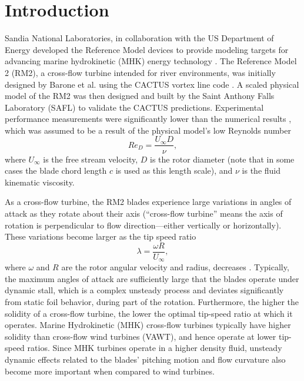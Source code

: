 \documentclass[10pt,letterpaper]{article}
\begin{document}
\linenumbers

\section*{Introduction}

Sandia National Laboratories, in collaboration with the US Department of Energy
developed the Reference Model devices to provide modeling targets for advancing
marine hydrokinetic (MHK) energy technology \cite{Neary2014}. The Reference
Model 2 (RM2), a cross-flow turbine intended for river environments, was
initially designed by Barone et al. \cite{Barone2011} using the CACTUS vortex
line code \cite{Murray2011}. A scaled physical model of the RM2 was then
designed and built by the Saint Anthony Falls Laboratory (SAFL) to validate the
CACTUS predictions. Experimental performance measurements were significantly
lower than the numerical results \cite{Hill2014}, which was assumed to be a
result of the physical model's low Reynolds number
\begin{equation}
    Re_D = \frac{U_\infty D}{\nu},
\label{eq:Re}
\end{equation}
where $U_\infty$ is the free stream velocity, $D$ is the rotor diameter (note
that in some cases the blade chord length $c$ is used as this length scale), and
$\nu$ is the fluid kinematic viscosity.

As a cross-flow turbine, the RM2 blades experience large variations in angles of
attack as they rotate about their axis (``cross-flow turbine'' means the axis of
rotation is perpendicular to flow direction---either vertically or
horizontally). These variations become larger as the tip speed ratio
\begin{equation}
    \lambda=\frac{\omega R}{U_\infty},
\end{equation}
where $\omega$ and $R$ are the rotor angular velocity and radius, decreases
\cite{Para2002}. Typically, the maximum angles of attack are sufficiently large
that the blades operate under dynamic stall, which is a complex unsteady process
and deviates significantly from static foil behavior, during part of the
rotation. Furthermore, the higher the solidity of a cross-flow turbine, the
lower the optimal tip-speed ratio at which it operates. Marine Hydrokinetic
(MHK) cross-flow turbines typically have higher solidity than cross-flow wind
turbines (VAWT), and hence operate at lower tip-speed ratios. Since MHK turbines
operate in a higher density fluid, unsteady dynamic effects related to the
blades' pitching motion and flow curvature also become more important when
compared to wind turbines.
\end{document}
